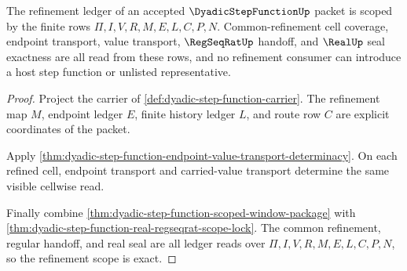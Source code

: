 \begin{theorem}
\label{thm:dyadic-step-function-refinement-ledger-scope}
The refinement ledger of an accepted $\DyadicStepFunctionUp$ packet is scoped
by the finite rows $\Pi,I,V,R,M,E,L,C,P,N$. Common-refinement cell coverage,
endpoint transport, value transport, $\RegSeqRatUp$ handoff, and $\RealUp$
seal exactness are all read from these rows, and no refinement consumer can
introduce a host step function or unlisted representative.
\end{theorem}
\begin{proof}
Project the carrier of \autoref{def:dyadic-step-function-carrier}. The
refinement map $M$, endpoint ledger $E$, finite history ledger $L$, and route
row $C$ are explicit coordinates of the packet.

Apply \autoref{thm:dyadic-step-function-endpoint-value-transport-determinacy}.
On each refined cell, endpoint transport and carried-value transport determine
the same visible cellwise read.

Finally combine \autoref{thm:dyadic-step-function-scoped-window-package} with
\autoref{thm:dyadic-step-function-real-regseqrat-scope-lock}. The common
refinement, regular handoff, and real seal are all ledger reads over
$\Pi,I,V,R,M,E,L,C,P,N$, so the refinement scope is exact.
\end{proof}

